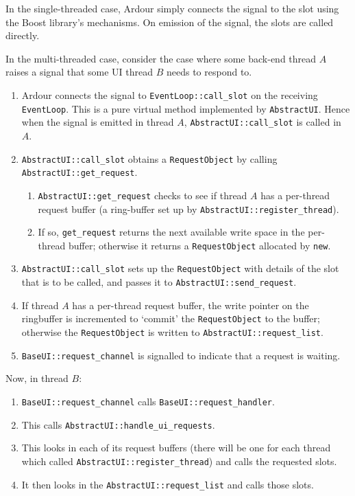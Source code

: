 \documentclass[10pt,a4paper]{book}
\newcommand{\code}[1]{\texttt{#1}}
\begin{document}
In the single-threaded case, Ardour simply connects the signal to the slot using the Boost
library's mechanisms.  On emission of the signal, the slots are called directly.

In the multi-threaded case, consider the case where some back-end
thread $A$ raises a signal that some UI thread $B$ needs to respond to.

\begin{enumerate}
\item Ardour connects the signal to \code{EventLoop::call\_slot} on
  the receiving \code{EventLoop}.  This is a pure virtual method
  implemented by \code{AbstractUI}.  Hence when the signal is emitted
  in thread $A$, \code{AbstractUI::call\_slot} is called in $A$.
\item \code{AbstractUI::call\_slot} obtains a \code{RequestObject} by
  calling \code{AbstractUI::get\_request}.
\begin{enumerate}
\item \code{AbstractUI::get\_request} checks to see if thread $A$ has
  a per-thread request buffer (a ring-buffer set up by
  \code{AbstractUI::register\_thread}).
\item If so, \code{get\_request} returns the next available write
  space in the per-thread buffer; otherwise it returns a
  \code{RequestObject} allocated by \code{new}.
\end{enumerate}
\item \code{AbstractUI::call\_slot} sets up the \code{RequestObject}
  with details of the slot that is to be called, and passes it to
  \code{AbstractUI::send\_request}.
\item If thread $A$ has a per-thread request buffer, the write pointer
  on the ringbuffer is incremented to `commit' the
  \code{RequestObject} to the buffer; otherwise the
  \code{RequestObject} is written to \code{AbstractUI::request\_list}.
\item \code{BaseUI::request\_channel} is signalled to indicate that a
  request is waiting.
\end{enumerate}

Now, in thread $B$:

\begin{enumerate}
\item \code{BaseUI::request\_channel} calls \code{BaseUI::request\_handler}.
\item This calls \code{AbstractUI::handle\_ui\_requests}.
\item This looks in each of its request buffers (there will be one for
  each thread which called \code{AbstractUI::register\_thread}) and calls the requested slots.
\item It then looks in the \code{AbstractUI::request\_list} and calls those slots.
\end{enumerate}
\end{document}
